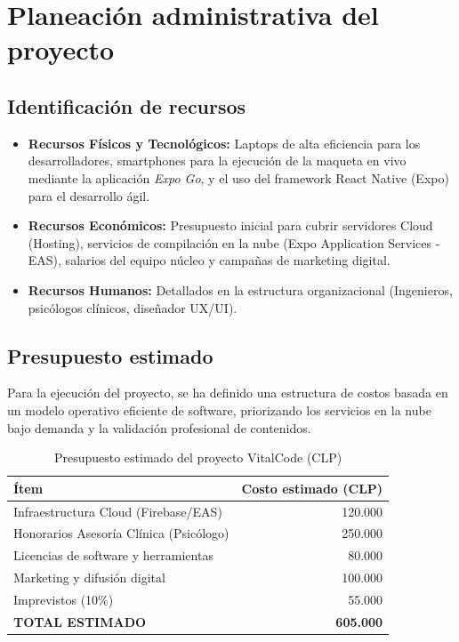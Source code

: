 \documentclass[12pt,letterpaper]{article}
\begin{document}
\section{Planeación administrativa del proyecto}

\subsection{Identificación de recursos}
\begin{itemize}[leftmargin=*]
    \item \textbf{Recursos Físicos y Tecnológicos:} Laptops de alta eficiencia para los desarrolladores, smartphones para la ejecución de la maqueta en vivo mediante la aplicación \textit{Expo Go}, y el uso del framework React Native (Expo) para el desarrollo ágil.
    \item \textbf{Recursos Económicos:} Presupuesto inicial para cubrir servidores Cloud (Hosting), servicios de compilación en la nube (Expo Application Services - EAS), salarios del equipo núcleo y campañas de marketing digital.
    \item \textbf{Recursos Humanos:} Detallados en la estructura organizacional (Ingenieros, psicólogos clínicos, diseñador UX/UI).
\end{itemize}

\subsection{Presupuesto estimado}
Para la ejecución del proyecto, se ha definido una estructura de costos basada en un modelo operativo eficiente de software, priorizando los servicios en la nube bajo demanda y la validación profesional de contenidos.

\begin{table}[H]
\centering
\caption{Presupuesto estimado del proyecto VitalCode (CLP)}
\begin{tabularx}{\textwidth}{X r}
\toprule
\textbf{Ítem} & \textbf{Costo estimado (CLP)} \\
\midrule
Infraestructura Cloud (Firebase/EAS) & 120.000 \\
Honorarios Asesoría Clínica (Psicólogo) & 250.000 \\
Licencias de software y herramientas & 80.000 \\
Marketing y difusión digital & 100.000 \\
Imprevistos (10\%) & 55.000 \\
\midrule
\textbf{TOTAL ESTIMADO} & \textbf{605.000} \\
\bottomrule
\end{tabularx}
\end{table}
\end{document}
